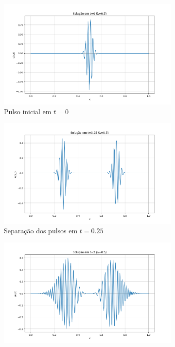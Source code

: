 \documentclass[column,amsmath,amssymb,floatfix]{revtex4}
\begin{document}
\begin{figure}[H]
	\centering
	\begin{subfigure}{0.35\textwidth}
		\includegraphics[width=\textwidth]{img/ex0305.png}
		\caption{Pulso inicial em $t=0$}
		\label{fig:ex3_5}
	\end{subfigure}
	\begin{subfigure}{0.35\textwidth}
		\includegraphics[width=\textwidth]{img/ex0306.png}
		\caption{Separação dos pulsos em $t=0.25$}
		\label{fig:ex3_6}
	\end{subfigure}
	\begin{subfigure}{0.35\textwidth}
		\includegraphics[width=\textwidth]{img/ex0307.png}

\end{subfigure}
\end{figure}
\end{document}
